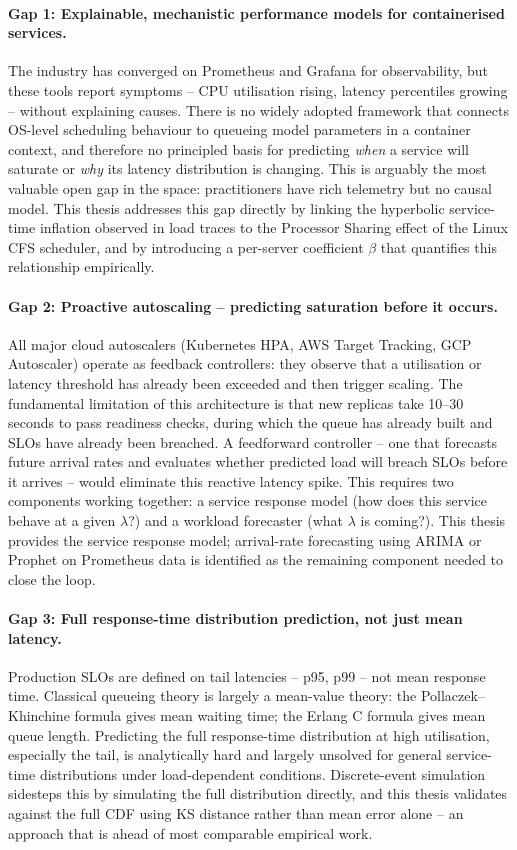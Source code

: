 \paragraph{Gap 1: Explainable, mechanistic performance models for containerised services.}
The industry has converged on Prometheus and Grafana for observability, but these tools report symptoms -- CPU utilisation rising, latency percentiles growing -- without explaining causes. There is no widely adopted framework that connects OS-level scheduling behaviour to queueing model parameters in a container context, and therefore no principled basis for predicting \emph{when} a service will saturate or \emph{why} its latency distribution is changing. This is arguably the most valuable open gap in the space: practitioners have rich telemetry but no causal model. This thesis addresses this gap directly by linking the hyperbolic service-time inflation observed in load traces to the Processor Sharing effect of the Linux CFS scheduler, and by introducing a per-server coefficient $\beta$ that quantifies this relationship empirically.

\paragraph{Gap 2: Proactive autoscaling -- predicting saturation before it occurs.}
All major cloud autoscalers (Kubernetes HPA, AWS Target Tracking, GCP Autoscaler) operate as feedback controllers: they observe that a utilisation or latency threshold has already been exceeded and then trigger scaling. The fundamental limitation of this architecture is that new replicas take 10--30 seconds to pass readiness checks, during which the queue has already built and SLOs have already been breached. A feedforward controller -- one that forecasts future arrival rates and evaluates whether predicted load will breach SLOs before it arrives -- would eliminate this reactive latency spike. This requires two components working together: a service response model (how does this service behave at a given $\lambda$?) and a workload forecaster (what $\lambda$ is coming?). This thesis provides the service response model; arrival-rate forecasting using ARIMA or Prophet on Prometheus data is identified as the remaining component needed to close the loop.

\paragraph{Gap 3: Full response-time distribution prediction, not just mean latency.}
Production SLOs are defined on tail latencies -- p95, p99 -- not mean response time. Classical queueing theory is largely a mean-value theory: the Pollaczek--Khinchine formula gives mean waiting time; the Erlang C formula gives mean queue length. Predicting the full response-time distribution at high utilisation, especially the tail, is analytically hard and largely unsolved for general service-time distributions under load-dependent conditions. Discrete-event simulation sidesteps this by simulating the full distribution directly, and this thesis validates against the full CDF using KS distance rather than mean error alone -- an approach that is ahead of most comparable empirical work.

